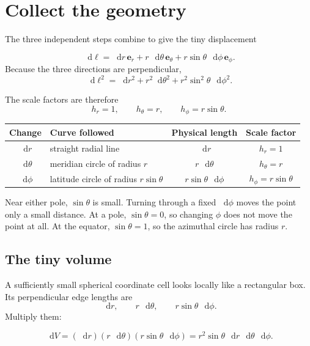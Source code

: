 \documentclass[11pt,a4paper]{article}
\newcommand{\er}{\bm e_r}
\newcommand{\etheta}{\bm e_\theta}
\newcommand{\ephi}{\bm e_\phi}
\newcommand{\dd}{\mathop{}\!\mathrm d}
\begin{document}
\clearpage

\section{Collect the geometry}

The three independent steps combine to give the tiny displacement
\begin{result}
\[
  \boxed{
  \dd\bm\ell
  =\dd r\,\er
  +r\,\dd\theta\,\etheta
  +r\sin\theta\,\dd\phi\,\ephi.}
\]
Because the three directions are perpendicular,
\[
  \boxed{
  \dd\ell^2
  =\dd r^2+r^2\dd\theta^2
  +r^2\sin^2\theta\,\dd\phi^2.}
\]
\end{result}

The scale factors are therefore
\[
  \boxed{h_r=1,\qquad h_\theta=r,\qquad h_\phi=r\sin\theta.}
\]

\begin{center}
\renewcommand{\arraystretch}{1.3}
\begin{tabularx}{0.94\textwidth}{>{\bfseries}c X c c}
\toprule
Change & Curve followed & Physical length & Scale factor\\
\midrule
$\dd r$ & straight radial line & $\dd r$ & $h_r=1$\\
$\dd\theta$ & meridian circle of radius $r$ & $r\,\dd\theta$ & $h_\theta=r$\\
$\dd\phi$ & latitude circle of radius $r\sin\theta$ & $r\sin\theta\,\dd\phi$ & $h_\phi=r\sin\theta$\\
\bottomrule
\end{tabularx}
\end{center}

\begin{notecheck}
Near either pole, \(\sin\theta\) is small. Turning through a fixed \(\dd\phi\) moves the point only a small distance. At a pole, \(\sin\theta=0\), so changing \(\phi\) does not move the point at all. At the equator, \(\sin\theta=1\), so the azimuthal circle has radius \(r\).
\end{notecheck}

\subsection{The tiny volume}

A sufficiently small spherical coordinate cell looks locally like a rectangular box. Its perpendicular edge lengths are
\[
  \dd r,\qquad r\,\dd\theta,\qquad r\sin\theta\,\dd\phi.
\]
Multiply them:
\begin{result}
\[
  \boxed{
  \dd V
  =(\dd r)(r\,\dd\theta)(r\sin\theta\,\dd\phi)
  =r^2\sin\theta\,\dd r\,\dd\theta\,\dd\phi.}
\]
\end{result}
\end{document}
